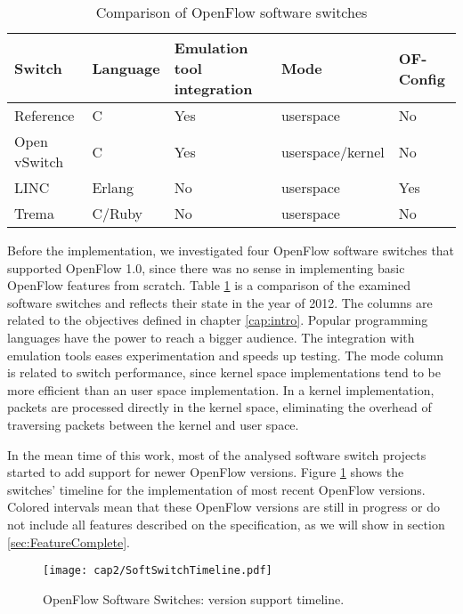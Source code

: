 \begin{table}[h]
\caption{Comparison of OpenFlow software switches}
\label{tab:relatedswitches}
\begin{tabular}{|l|l|l|l|l|}
\hline
\textbf{Switch} & \textbf{Language} & \textbf{Emulation tool integration} & \textbf{Mode}    & \textbf{OF-Config} \\ \hline
Reference       & C                 & Yes                        & userspace        & No                         \\ \hline
Open vSwitch    & C                 & Yes                        & userspace/kernel & No                         \\ \hline
LINC            & Erlang            & No                    & userspace        & Yes                        \\ \hline
Trema           & C/Ruby            & No                    & userspace        & No                         \\ \hline
\end{tabular}
\end{table}

Before the implementation, we investigated four OpenFlow software switches that supported OpenFlow 1.0, since there was no sense in implementing basic OpenFlow features from scratch. Table \ref{tab:relatedswitches} is a comparison of the examined software switches and reflects their state in the year of 2012. The columns are related to the objectives defined in chapter \ref{cap:intro}. Popular programming languages have the power to reach a bigger audience. The integration with emulation tools eases experimentation and speeds up testing. The mode column is related to switch performance, since kernel space implementations tend to be more efficient than an user space implementation. In a kernel implementation, packets are processed directly in the kernel space, eliminating the overhead of traversing packets between the kernel and user space.

In the mean time of this work, most of the analysed software switch projects started to add support for newer OpenFlow versions. Figure \ref{fig:ofswitchtimeline} shows the switches' timeline for the implementation of most recent OpenFlow versions. Colored intervals mean that these OpenFlow versions are still in progress or do not include all features described on the specification, as we will show in section \ref{sec:FeatureComplete}.

\begin{figure}[H]
\centering
\texttt{[image: cap2/SoftSwitchTimeline.pdf]}
\caption{OpenFlow Software Switches: version support timeline.}
\label{fig:ofswitchtimeline}
\end{figure}

